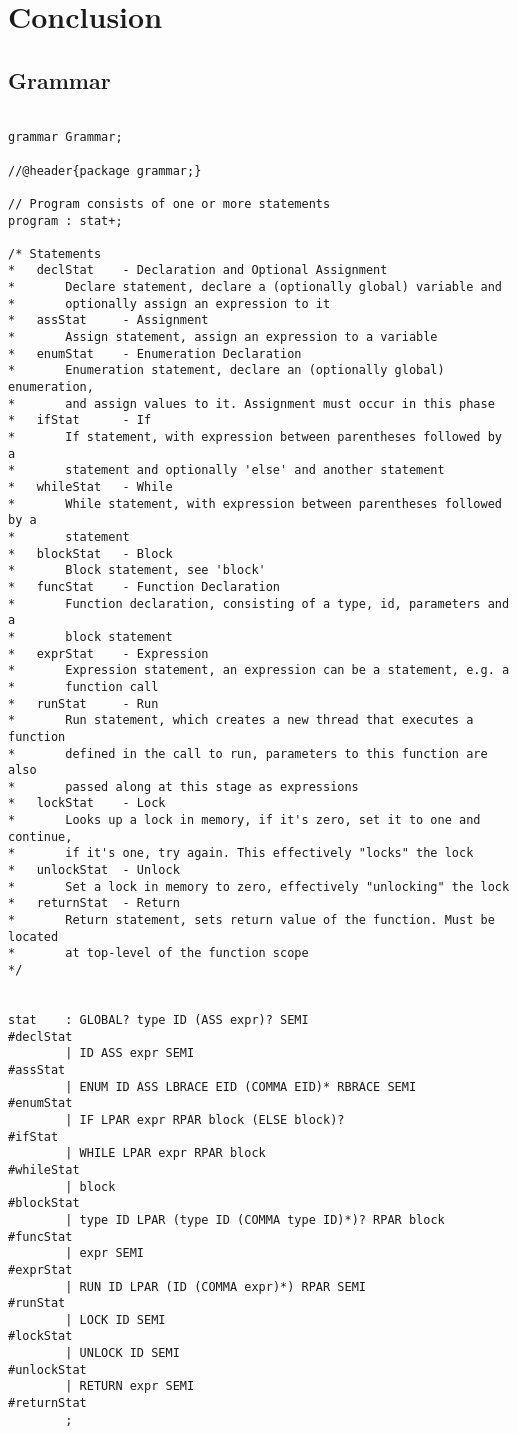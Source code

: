 \documentclass[10pt,a4paper]{report}
\begin{document}
\chapter{Conclusion}

\begin{appendices}

\chapter{Grammar}

\begin{lstlisting}

grammar Grammar;

//@header{package grammar;}

// Program consists of one or more statements
program	: stat+;

/* Statements
* 	declStat	- Declaration and Optional Assignment
*		Declare statement, declare a (optionally global) variable and 
*		optionally assign an expression to it
*	assStat		- Assignment
*		Assign statement, assign an expression to a variable
*	enumStat	- Enumeration Declaration
*		Enumeration statement, declare an (optionally global) enumeration, 
*		and assign values to it. Assignment must occur in this phase
*	ifStat		- If
*		If statement, with expression between parentheses followed by a 
*		statement and optionally 'else' and another statement
*	whileStat	- While
*		While statement, with expression between parentheses followed by a
*		statement
*	blockStat	- Block
*		Block statement, see 'block'
*	funcStat	- Function Declaration
*		Function declaration, consisting of a type, id, parameters and a 
*		block statement
*	exprStat	- Expression
*		Expression statement, an expression can be a statement, e.g. a  
*		function call
*	runStat		- Run
*		Run statement, which creates a new thread that executes a function 
*		defined in the call to run, parameters to this function are also  
*		passed along at this stage as expressions
*	lockStat	- Lock
*		Looks up a lock in memory, if it's zero, set it to one and continue, 
*		if it's one, try again. This effectively "locks" the lock
*	unlockStat	- Unlock
*		Set a lock in memory to zero, effectively "unlocking" the lock
*	returnStat	- Return
*		Return statement, sets return value of the function. Must be located 
*		at top-level of the function scope
*/


stat	: GLOBAL? type ID (ASS expr)? SEMI						#declStat
		| ID ASS expr SEMI 										#assStat
		| ENUM ID ASS LBRACE EID (COMMA EID)* RBRACE SEMI		#enumStat
		| IF LPAR expr RPAR block (ELSE block)?					#ifStat
		| WHILE LPAR expr RPAR block 							#whileStat
		| block													#blockStat
		| type ID LPAR (type ID (COMMA type ID)*)? RPAR block	#funcStat
		| expr SEMI												#exprStat
		| RUN ID LPAR (ID (COMMA expr)*) RPAR SEMI				#runStat
		| LOCK ID SEMI											#lockStat
		| UNLOCK ID SEMI										#unlockStat
		| RETURN expr SEMI										#returnStat
		;


\end{lstlisting}
\end{appendices}
\end{document}
